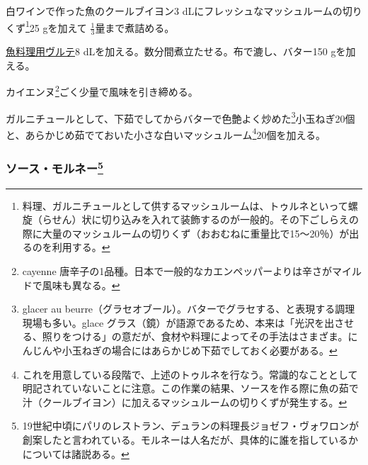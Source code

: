 \begin{recette}


白ワインで作った魚のクールブイヨン3
dLにフレッシュなマッシュルームの切りくず\footnote{料理、ガルニチュールとして供するマッシュルームは、トゥルネといって螺旋（らせん）状に切り込みを入れて装飾するのが一般的。その下ごしらえの際に大量のマッシュルームの切りくず（おおむねに重量比で15〜20％）が出るのを利用する。}25
gを加えて \(\frac{1}{3}\)量まで煮詰める。

\protect\hyperlink{veloute-de-poisson}{魚料理用ヴルテ}8
dLを加える。数分間煮立たせる。布で漉し、バター150 gを加える。

カイエンヌ\footnote{cayenne
  唐辛子の1品種。日本で一般的なカエンペッパーよりは辛さがマイルドで風味も異なる。}ごく少量で風味を引き締める。

ガルニチュールとして、下茹でしてからバターで色艶よく炒めた\footnote{glacer
  au
  beurre（グラセオブール）。バターでグラセする、と表現する調理現場も多い。glace
  グラス（鏡）が語源であるため、本来は「光沢を出させる、照りをつける」の意だが、食材や料理によってその手法はさまざま。にんじんや小玉ねぎの場合にはあらかじめ下茹でしておく必要がある。}小玉ねぎ20個と、あらかじめ茹でておいた小さな白いマッシュルーム\footnote{これを用意している段階で、上述のトゥルネを行なう。常識的なこととして明記されていないことに注意。この作業の結果、ソースを作る際に魚の茹で汁（クールブイヨン）に加えるマッシュルームの切りくずが発生する。}20個を加える。

\atoaki{}

\hypertarget{sauce-mornay}{%
\subsubsection[ソース・モルネー]{\texorpdfstring{ソース・モルネー\footnote{19世紀中頃にパリのレストラン、デュランの料理長ジョゼフ・ヴォワロンが創案したと言われている。モルネーは人名だが、具体的に誰を指しているかについては諸説ある。}}{ソース・モルネー}}\label{sauce-mornay}}


 


\end{recette}
